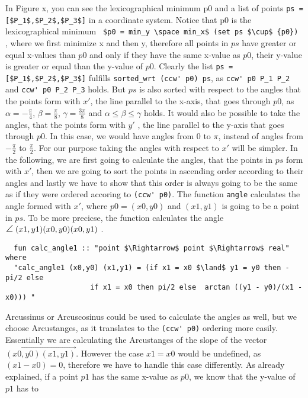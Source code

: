 In Figure x, you can see the lexicographical minimum p0 and a list of points \lstinline|ps = [$P_1$,$P_2$,$P_3$]|
in a coordinate system. Notice that p0 is the lexicographical minimum \lstinline| $p0 = min_y \space min_x$ (set ps $\cup$ {p0}) |, 
where we first minimize x and then y, therefore all points in $ps$ have greater or equal x-values than $p0$ and 
only if they have the same x-value as $p0$, their y-value is greater or equal than the y-value of $p0$.
Clearly the list \lstinline|ps = [$P_1$,$P_2$,$P_3$]| fulfills 
\lstinline|sorted_wrt (ccw' p0) ps|, as \lstinline|ccw' p0 P_1 P_2| and  \lstinline|ccw' p0 P_2 P_3|
holds. But $ps$ is also sorted with respect to the angles that the points form with $x'$, the line parallel
to the x-axis, that goes through $p0$, as $\alpha = -\frac{\pi}{4}$, $\beta = \frac{\pi}{8}$, $\gamma = \frac{3 \pi}{8}$
and $\alpha \le  \beta \le \gamma $ holds. It would also be possible to take the angles, that 
the points form with $y'$ , the line parallel to the y-axis that goes through $p0$. In this case,
we would have angles from $0$ to $\pi$, instead of angles from $-\frac{\pi}{2}$ to  $\frac{\pi}{2}$.
For our purpose taking the angles with respect to $x'$ will be simpler. In the following, we are first
going to calculate the angles, that the points in $ps$ form with $x'$, then we are going to sort the points
in ascending order according to their angles and lastly we have to show that this order is always 
going to be the same as if they were ordered accoring to \lstinline|(ccw' p0)|. The function \lstinline|angle|
calculates the angle formed with $x'$, where $p0 = (x0,y0)$ and $(x1,y1)$ is going to be
a point in $ps$. To be more precicse, the function calculates the angle 
$\mathrel{\text{\large$\angle$}} (x1,y1) (x0,y0) (x0,y1)$ .
\begin{lstlisting}
  fun calc_angle1 :: "point $\Rightarrow$ point $\Rightarrow$ real" where
  "calc_angle1 (x0,y0) (x1,y1) = (if x1 = x0 $\land$ y1 = y0 then -pi/2 else 
                    if x1 = x0 then pi/2 else  arctan ((y1 - y0)/(x1 - x0))) "
\end{lstlisting}
Arcussinus or Arcuscosinus could be used to calculate the angles as well, but we choose 
Arcustanges, as it translates to the \lstinline|(ccw' p0)| ordering more easily.
Essentially we are calculating the Arcustanges of the slope of the vector $\overrightarrow{(x0,y0)(x1,y1)}$.
However the case $x1=x0$ would be undefined, as $(x1 - x0) = 0$, therefore we have to handle this case differently.  
As already explained, if a point $p1$ has the same x-value as $p0$, we know that the y-value of $p1$ has to
